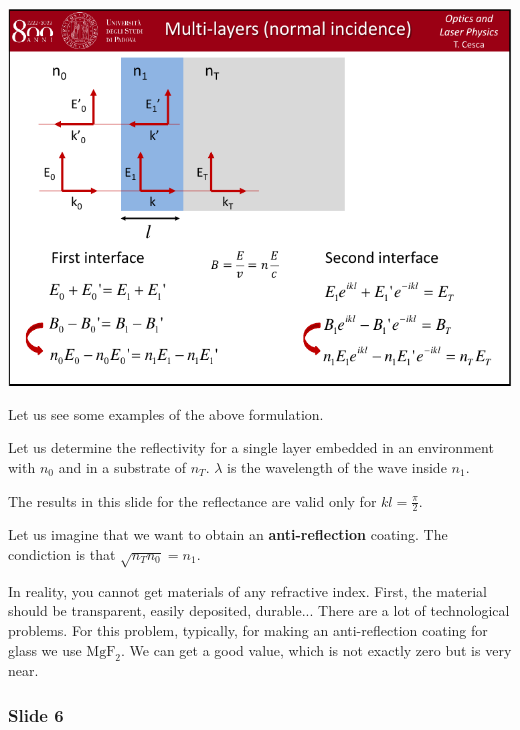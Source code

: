 \documentclass[../main/main.tex]{subfiles}
\begin{document}
\begin{minipage}[]{0.5\linewidth}
\centering
\includegraphics[page=5,width=1\textwidth]{../lessons/pdf_file/06_lecture.pdf}
\end{minipage}
\hspace{0.3cm}\vspace{0.3cm}
\begin{minipage}[c]{0.47\linewidth}

Let us see some examples of the above formulation.

Let us determine the reflectivity for a single layer embedded in an environment with \( n_0 \) and in a substrate of \( n_T \). \( \lambda  \) is the wavelength of the wave inside \( n_1 \).

The results in this slide for the reflectance are valid only for \( k l = \frac{\pi }{2} \).

Let us imagine that we want to obtain an \textbf{anti-reflection} coating. The condiction is that \( \sqrt{n_T n_0} = n_1  \).

In reality, you cannot get materials of any refractive index. First, the material should be transparent, easily deposited, durable... There are a lot of technological problems. For this problem, typically, for making an anti-reflection coating for glass we use $\text{MgF}_2$.
We can get a good value, which is not exactly zero but is very near.

\end{minipage}

\subsubsection*{Slide 6}
\end{document}
